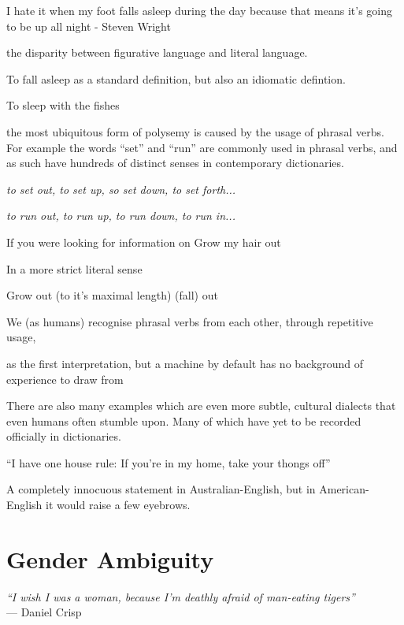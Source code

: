 I hate it when my foot falls asleep during the day because that means it's going to be up all night - Steven Wright

the disparity between figurative language and literal language.

To fall asleep as a standard definition, but also an idiomatic defintion.

To sleep with the fishes


the most ubiquitous form of polysemy is caused by the usage of phrasal verbs. For example the words ``set'' and ``run'' are commonly used in phrasal verbs, and as such have hundreds of distinct senses in contemporary dictionaries. 

\begin{center}
	\textit{to set out, to set up, so set down, to set forth...}

    \textit{to run out, to run up, to run down, to run in...}
\end{center}

If you were looking for information on 
Grow my hair out

In a more strict literal sense

Grow out (to it's maximal length)
(fall) out

We (as humans) recognise phrasal verbs from each other, through repetitive usage, 

as the first interpretation, but a machine by default has no background of experience to draw from

There are also many examples which are even more subtle, cultural dialects that even humans often stumble upon. Many of which have yet to be recorded officially in dictionaries. 

``I have one house rule: If you're in my home, take your thongs off'' 

A completely innocuous statement in Australian-English, but in American-English it would raise a few eyebrows.
















\section{Gender Ambiguity}
\begin{center}
\textit{``I wish I was a woman, because I'm deathly afraid of man-eating tigers''} \\ --- Daniel Crisp
\end{center}

